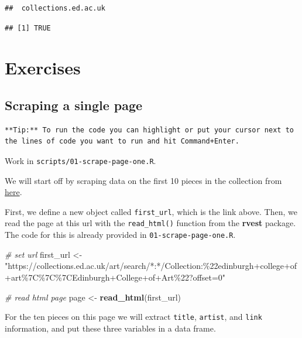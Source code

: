 \documentclass[
]{article}
\newenvironment{Shaded}{\begin{snugshade}}{\end{snugshade}}
\newcommand{\CommentTok}[1]{\textcolor[rgb]{0.56,0.35,0.01}{\textit{#1}}}
\newcommand{\FunctionTok}[1]{\textcolor[rgb]{0.13,0.29,0.53}{\textbf{#1}}}
\newcommand{\NormalTok}[1]{#1}
\newcommand{\OtherTok}[1]{\textcolor[rgb]{0.56,0.35,0.01}{#1}}
\newcommand{\StringTok}[1]{\textcolor[rgb]{0.31,0.60,0.02}{#1}}
\begin{document}
\begin{verbatim}
##  collections.ed.ac.uk
\end{verbatim}

\begin{verbatim}
## [1] TRUE
\end{verbatim}

\section{Exercises}\label{exercises}

\subsection{Scraping a single page}\label{scraping-a-single-page}

\begin{verbatim}
**Tip:** To run the code you can highlight or put your cursor next to the lines of code you want to run and hit Command+Enter.
\end{verbatim}

Work in \texttt{scripts/01-scrape-page-one.R}.

We will start off by scraping data on the first 10 pieces in the
collection from
\href{https://collections.ed.ac.uk/art/search/*:*/Collection:\%22edinburgh+college+of+art\%7C\%7C\%7CEdinburgh+College+of+Art\%22?offset=0}{here}.

First, we define a new object called \texttt{first\_url}, which is the
link above. Then, we read the page at this url with the
\texttt{read\_html()} function from the \textbf{rvest} package. The code
for this is already provided in \texttt{01-scrape-page-one.R}.

\begin{Shaded}
\begin{Highlighting}[]
\CommentTok{\# set url}
\NormalTok{first\_url }\OtherTok{\textless{}{-}} \StringTok{"https://collections.ed.ac.uk/art/search/*:*/Collection:\%22edinburgh+college+of+art\%7C\%7C\%7CEdinburgh+College+of+Art\%22?offset=0"}

\CommentTok{\# read html page}
\NormalTok{page }\OtherTok{\textless{}{-}} \FunctionTok{read\_html}\NormalTok{(first\_url)}
\end{Highlighting}
\end{Shaded}

For the ten pieces on this page we will extract \texttt{title},
\texttt{artist}, and \texttt{link} information, and put these three
variables in a data frame.
\end{document}
